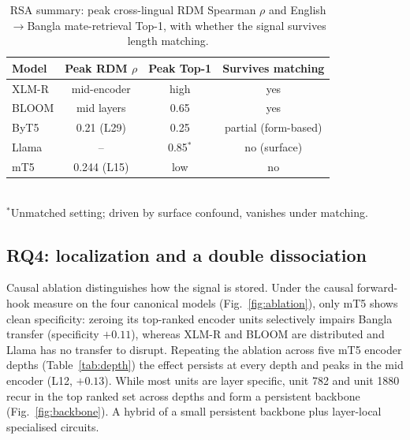 \documentclass[preprint,12pt,authoryear]{elsarticle}
\begin{document}
\begin{table}[H]
\caption{RSA summary: peak cross-lingual RDM Spearman $\rho$ and English$\to$Bangla mate-retrieval Top-1, with whether the signal survives length matching.}
\label{tab:rsa}
\centering
\small
\setlength{\tabcolsep}{5pt}
\begin{tabular}{lccc}
\toprule
\textbf{Model} & \textbf{Peak RDM $\rho$} & \textbf{Peak Top-1} & \textbf{Survives matching} \\
\midrule
XLM-R & mid-encoder & high & yes \\
BLOOM & mid layers  & 0.65 & yes \\
ByT5  & 0.21 (L29)  & 0.25 & partial (form-based) \\
Llama & --          & 0.85$^\ast$ & no (surface) \\
mT5   & 0.244 (L15) & low  & no \\
\bottomrule
\end{tabular}
\\[2pt]
{\footnotesize $^\ast$Unmatched setting; driven by surface confound, vanishes under matching.}
\end{table}

\subsection{RQ4: localization and a double dissociation}
Causal ablation distinguishes how the signal is stored. Under the causal forward-hook measure on the four canonical models (Fig.~\ref{fig:ablation}), only mT5 shows clean specificity: zeroing its top-ranked encoder units selectively impairs Bangla transfer (specificity $+0.11$), whereas XLM-R and BLOOM are distributed and Llama has no transfer to disrupt. Repeating the ablation across five mT5 encoder depths (Table~\ref{tab:depth}) the effect persists at every depth and peaks in the mid encoder (L12, $+0.13$). While most units are layer specific, unit 782 and unit 1880 recur in the top ranked set across depths and form a persistent backbone (Fig.~\ref{fig:backbone}). A hybrid of a small persistent backbone plus layer-local specialised circuits.
\end{document}
